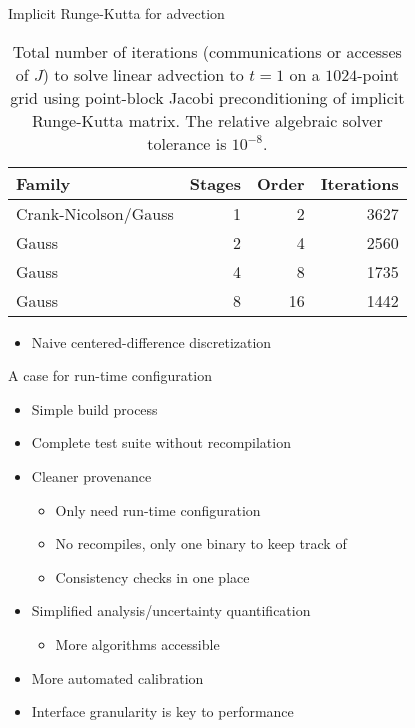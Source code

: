 \documentclass{beamer}
\begin{document}
\begin{frame}{Implicit Runge-Kutta for advection}
  \begin{table}
    \centering
    \caption{Total number of iterations (communications or accesses of $J$) to solve linear advection to $t=1$ on a $1024$-point grid using point-block Jacobi preconditioning of implicit Runge-Kutta matrix.
      The relative algebraic solver tolerance is $10^{-8}$.}\label{tab:irk-advection}
    \begin{tabular}{lrrr}
      \toprule
      Family & Stages & Order & Iterations \\
      \midrule
      Crank-Nicolson/Gauss & 1 & 2 & 3627 \\
      Gauss & 2 & 4 & 2560 \\
      Gauss & 4 & 8 & 1735 \\
      Gauss & 8 & 16 & 1442 \\
      \bottomrule
    \end{tabular}
  \end{table}
  \begin{itemize}
  \item Naive centered-difference discretization
  \end{itemize}
\end{frame}

\begin{frame}{A case for run-time configuration}
  \begin{itemize}
  \item Simple build process
  \item Complete test suite without recompilation
  \item Cleaner provenance
    \begin{itemize}
    \item Only need run-time configuration
    \item No recompiles, only one binary to keep track of
    \item Consistency checks in one place
    \end{itemize}
  \item Simplified analysis/uncertainty quantification
    \begin{itemize}
    \item More algorithms accessible
    \end{itemize}
  \item More automated calibration
  \item Interface granularity is key to performance
  \end{itemize}
\end{frame}
\end{document}
